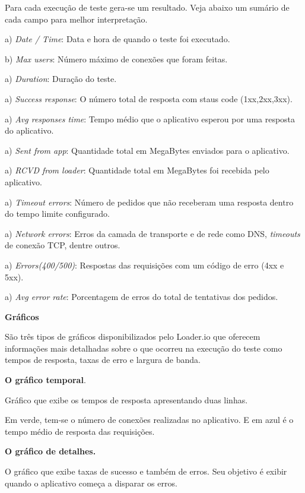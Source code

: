   Para cada execução de teste gera-se um resultado. Veja abaixo um sumário de cada campo para melhor interpretação.
  
  \begin{compactitem}
    \item[a)] \textit{Date / Time}: Data e hora de quando o teste foi executado.
    \item[b)] \textit{Max users}: Número máximo de conexões que foram feitas.
    \item[a)] \textit{Duration}:  Duração do teste.
    \item[a)] \textit{Success response}: O número total de resposta com staus code (1xx,2xx,3xx).
    \item[a)] \textit{Avg responses time}: Tempo médio que o aplicativo esperou por uma resposta do aplicativo.
    \item[a)] \textit{Sent from app}: Quantidade total em MegaBytes enviados para o aplicativo.
    \item[a)] \textit{RCVD from loader}: Quantidade total em MegaBytes foi recebida pelo aplicativo.
    \item[a)] \textit{Timeout errors}: Número de pedidos que não receberam uma resposta dentro do tempo limite configurado.
    \item[a)] \textit{Network errors}: Erros da camada de transporte e de rede como \ac{DNS}, \textit{timeouts} de conexão TCP, dentre outros.
    \item[a)] \textit{Errors(400/500)}: Respostas das requisições com um código de erro (4xx e 5xx).
    \item[a)] \textit{Avg error rate}: Porcentagem de erros do total de tentativas dos pedidos.
  \end{compactitem}

  \textbf{Gráficos}
  
  São três tipos de gráficos disponibilizados pelo Loader.io que oferecem informações mais detalhadas 
  sobre o que ocorreu na execução do teste como tempos de resposta, taxas de erro e largura de banda.
  
  \textbf{O gráfico temporal}.
  
  Gráfico que exibe os tempos de resposta apresentando duas linhas.
  
  Em verde, tem-se o número de conexões realizadas no aplicativo. E em azul é o tempo médio de resposta das
  requisições.
  
  \textbf{O gráfico de detalhes.}
  
  O gráfico que exibe taxas de sucesso e também de erros. Seu objetivo é exibir quando o aplicativo
  começa a disparar os erros.
  
